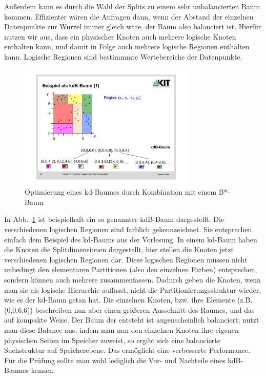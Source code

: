 Außerdem kann es durch die Wahl der Splits
zu einem sehr unbalancierten Baum kommen. Effizienter wären die Anfragen dann,
wenn der Abstand der einzelnen Datenpunkte zur Wurzel immer gleich wäre, der 
Baum also balanciert ist. Hierfür nutzen wir aus, dass ein physischer Knoten
auch mehrere logische Knoten enthalten kann, und damit in Folge auch mehrere 
logische Regionen enthalten kann. Logische Regionen sind bestimmmte Wertebereiche
der Datenpunkte.


\begin{figure}[htbp]
	\centering
	\includegraphics[width=0.75\textwidth]{Figures/kdB_Tree}
	\caption[kdB-Baum]{Optimierung eines kd-Baumes durch Kombination mit einem B*-Baum}
	\label{fig:kdB_Tree}
\end{figure}

In Abb.~\ref{fig:kdB_Tree} ist beispielhaft ein so genannter kdB-Baum dargestellt.
Die verschiedenen logischen Regionen sind farblich gekennzeichnet. Sie entsprechen
einfach dem Beispiel des kd-Baums aus der Vorlesung. In einem kd-Baum
haben die Knoten die Splitdimensionen dargestellt, hier stellen die Knoten jetzt 
verschiedenen logischen Regionen dar.
Diese logischen Regionen müssen nicht unbedingt den elementaren Partitionen
(also den einzelnen Farben) entsprechen, sondern können auch mehrere 
zusammenfassen. Dadurch geben die Knoten, wenn man sie als logische
Hierarchie auffasst, nicht die Partitionierungsstruktur wieder, wie es der kd-Baum
getan hat. Die einzelnen Knoten, bzw. ihre Elemente (z.B. (0,0,6,6)) beschreiben
nun aber einen größeren Ausschnitt des Raumes, und das auf kompakte Weise.
Der Baum der entsteht ist augenscheinlich balanciert; nutzt man diese Balance aus,
indem man nun den einzelnen Knoten ihre eigenen physischen Seiten im Speicher
zuweist, so ergibt sich eine balancierte Suchstruktur auf Speicherebene. Das ermöglicht eine
verbesserte Performance.
Für die Prüfung sollte man wohl lediglich die Vor- und Nachteile eines kdB-Baumes
kennen.

